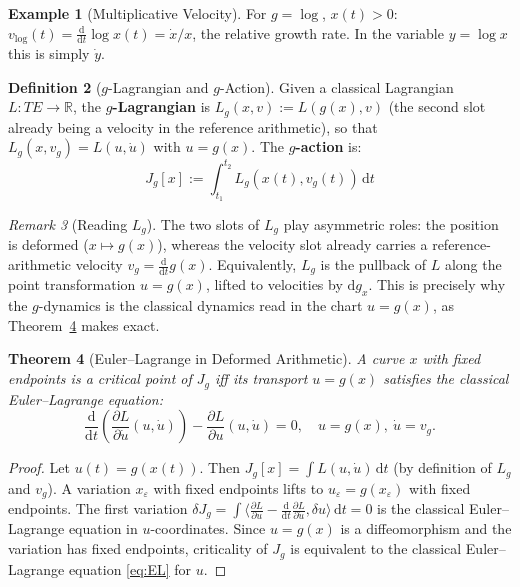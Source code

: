 \documentclass[11pt,twocolumn]{article}
\theoremstyle{plain}
\newtheorem{theorem}{Theorem}
\theoremstyle{definition}
\newtheorem{definition}[theorem]{Definition}
\newtheorem{example}[theorem]{Example}
\theoremstyle{remark}
\newtheorem{remark}[theorem]{Remark}
\newcommand{\R}{\mathbb{R}}
\newcommand{\dd}{\mathrm{d}}
\begin{document}
\begin{example}[Multiplicative Velocity]
For $g = \log$, $x(t) > 0$: $v_{\log}(t) = \frac{\dd}{\dd t}\log x(t) = \dot{x}/x$, the relative growth rate. In the variable $y = \log x$ this is simply $\dot{y}$.
\end{example}

\begin{definition}[$g$-Lagrangian and $g$-Action]\label{def:g-lagrangian}
Given a classical Lagrangian $L: TE \to \R$, the \textbf{$g$-Lagrangian} is $L_g(x, v) := L(g(x), v)$ (the second slot already being a velocity in the reference arithmetic), so that $L_g(x, v_g) = L(u, \dot{u})$ with $u = g(x)$. The \textbf{$g$-action} is:
\begin{equation}
J_g[x] := \int_{t_1}^{t_2} L_g(x(t), v_g(t))\,\dd t
\end{equation}
\end{definition}

\begin{remark}[Reading $L_g$]\label{rem:read-Lg}
The two slots of $L_g$ play asymmetric roles: the position is deformed ($x\mapsto g(x)$), whereas the velocity
slot already carries a reference-arithmetic velocity $v_g=\tfrac{\dd}{\dd t}g(x)$. Equivalently, $L_g$ is the
pullback of $L$ along the point transformation $u=g(x)$, lifted to velocities by $\dd g_x$. This is precisely
why the $g$-dynamics is the classical dynamics read in the chart $u=g(x)$, as Theorem~\ref{thm:EL} makes exact.
\end{remark}

\begin{theorem}[Euler--Lagrange in Deformed Arithmetic]\label{thm:EL}
A curve $x$ with fixed endpoints is a critical point of $J_g$ iff its transport $u = g(x)$ satisfies the classical Euler--Lagrange equation:
\begin{equation}\label{eq:EL}
\boxed{\frac{\dd}{\dd t}\!\left(\frac{\partial L}{\partial \dot{u}}(u, \dot{u})\right) - \frac{\partial L}{\partial u}(u, \dot{u}) = 0,\quad u = g(x),\ \dot{u} = v_g.}
\end{equation}
\end{theorem}

\begin{proof}
Let $u(t) = g(x(t))$. Then $J_g[x] = \int L(u, \dot{u})\,\dd t$ (by definition of $L_g$ and $v_g$). A variation $x_\varepsilon$ with fixed endpoints lifts to $u_\varepsilon = g(x_\varepsilon)$ with fixed endpoints. The first variation $\delta J_g = \int \langle\frac{\partial L}{\partial u} - \frac{\dd}{\dd t}\frac{\partial L}{\partial\dot{u}}, \delta u\rangle\,\dd t = 0$ is the classical Euler--Lagrange equation in $u$-coordinates. Since $u = g(x)$ is a diffeomorphism and the variation has fixed endpoints, criticality of $J_g$ is equivalent to the classical Euler--Lagrange equation \eqref{eq:EL} for $u$.
\end{proof}
\end{document}
